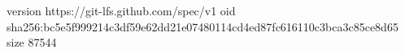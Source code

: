 version https://git-lfs.github.com/spec/v1
oid sha256:bc5e5f999214c3df59e62dd21e07480114cd4ed87fc616110c3bca3c85ce8d65
size 87544
